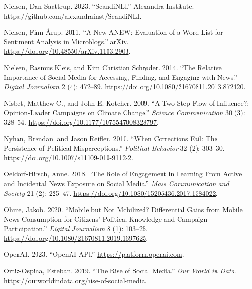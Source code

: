 \documentclass[
]{article}
\newlength{\cslhangindent}
\newlength{\cslentryspacingunit} %
\newenvironment{CSLReferences}[2] %
 {%
  \setlength{\parindent}{0pt}
  \ifodd #1
  \let\oldpar\par
  \def\par{\hangindent=\cslhangindent\oldpar}
  \fi
  \setlength{\parskip}{#2\cslentryspacingunit}
 }%
 {}
\begin{document}
\begin{CSLReferences}{1}{0}
\leavevmode{}%
Nielsen, Dan Saattrup. 2023. {``{ScandiNLI}.''} Alexandra Institute.
\url{https://github.com/alexandrainst/ScandiNLI}.

\leavevmode{}%
Nielsen, Finn Årup. 2011. {``A New {ANEW}: {Evaluation} of a Word List
for Sentiment Analysis in Microblogs.''} arXiv.
\url{https://doi.org/10.48550/arXiv.1103.2903}.

\leavevmode{}%
Nielsen, Rasmus Kleis, and Kim Christian Schrøder. 2014. {``The
{Relative} {Importance} of {Social} {Media} for {Accessing}, {Finding},
and {Engaging} with {News}.''} \emph{Digital Journalism} 2 (4): 472--89.
\url{https://doi.org/10.1080/21670811.2013.872420}.

\leavevmode{}%
Nisbet, Matthew C., and John E. Kotcher. 2009. {``A {Two}-{Step} {Flow}
of {Influence}?: {Opinion}-{Leader} {Campaigns} on {Climate}
{Change}.''} \emph{Science Communication} 30 (3): 328--54.
\url{https://doi.org/10.1177/1075547008328797}.

\leavevmode{}%
Nyhan, Brendan, and Jason Reifler. 2010. {``When {Corrections} {Fail}:
{The} {Persistence} of {Political} {Misperceptions}.''} \emph{Political
Behavior} 32 (2): 303--30.
\url{https://doi.org/10.1007/s11109-010-9112-2}.

\leavevmode{}%
Oeldorf-Hirsch, Anne. 2018. {``The {Role} of {Engagement} in {Learning}
{From} {Active} and {Incidental} {News} {Exposure} on {Social}
{Media}.''} \emph{Mass Communication and Society} 21 (2): 225--47.
\url{https://doi.org/10.1080/15205436.2017.1384022}.

\leavevmode{}%
Ohme, Jakob. 2020. {``Mobile but {Not} {Mobilized}? {Differential}
{Gains} from {Mobile} {News} {Consumption} for {Citizens}' {Political}
{Knowledge} and {Campaign} {Participation}.''} \emph{Digital Journalism}
8 (1): 103--25. \url{https://doi.org/10.1080/21670811.2019.1697625}.

\leavevmode{}%
OpenAI. 2023. {``{OpenAI} {API}.''} \url{https://platform.openai.com}.

\leavevmode{}%
Ortiz-Ospina, Esteban. 2019. {``The Rise of Social Media.''} \emph{Our
World in Data}. \url{https://ourworldindata.org/rise-of-social-media}.


\end{CSLReferences}
\end{document}
